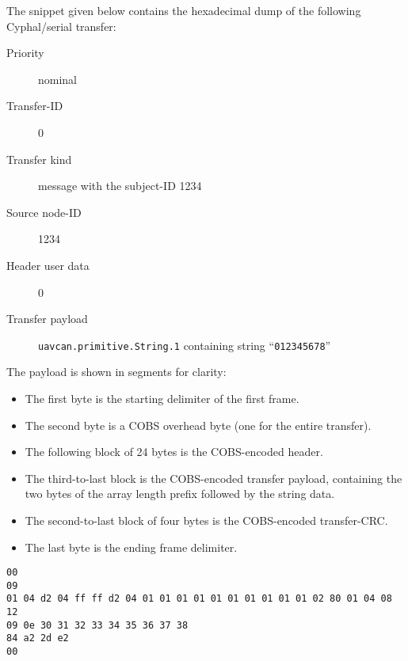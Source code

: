 %
%
\begin{remark}
    The snippet given below contains the hexadecimal dump of the following Cyphal/serial transfer:

    \begin{description}
        \item[Priority] nominal
        \item[Transfer-ID] 0
        \item[Transfer kind] message with the subject-ID 1234
        \item[Source node-ID] 1234
        \item[Header user data] 0
        \item[Transfer payload] \verb|uavcan.primitive.String.1| containing string ``\verb|012345678|''
    \end{description}

    The payload is shown in segments for clarity:

    \begin{itemize}
        \item The first byte is the starting delimiter of the first frame.
        \item The second byte is a COBS overhead byte (one for the entire transfer).
        \item The following block of 24 bytes is the COBS-encoded header.
        \item The third-to-last block is the COBS-encoded transfer payload,
        containing the two bytes of the array length prefix followed by the string data.
        \item The second-to-last block of four bytes is the COBS-encoded transfer-CRC.
        \item The last byte is the ending frame delimiter.
    \end{itemize}

    \begin{verbatim}
00
09
01 04 d2 04 ff ff d2 04 01 01 01 01 01 01 01 01 01 01 02 80 01 04 08 12
09 0e 30 31 32 33 34 35 36 37 38
84 a2 2d e2
00
    \end{verbatim}
\end{remark}

